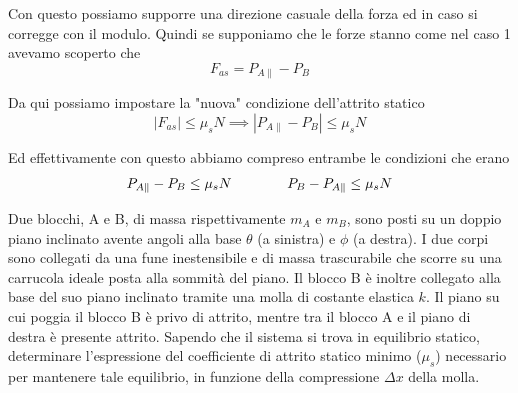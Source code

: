 \documentclass{rapport}
\begin{document}
Con questo possiamo supporre una direzione casuale della forza ed in caso si corregge con il modulo. Quindi se supponiamo che le forze stanno come nel caso 1 avevamo scoperto che 
\[
 F_{as} = P_{A\parallel} -P_{B}   
\]

Da qui possiamo impostare la "nuova" condizione dell'attrito statico 
\[
|F_{as}| \leq \mu_s N \implies |P_{A\parallel} -P_{B}  | \leq \mu_s N 
\]

Ed effettivamente con questo abbiamo compreso entrambe le condizioni che erano 
\[
\begin{array}{c@{\qquad}@{\qquad}c}
  P_{A\parallel} - P_{B}      \leq \mu_s N &   P_{B} -P_{A\parallel}      \leq \mu_s N
\end{array}
\]

\begin{esercizio}{}{}
  Due blocchi, A e B, di massa rispettivamente $m_A$ e $m_B$, sono posti su un doppio piano inclinato avente angoli alla base $\theta$ (a sinistra) e $\phi$ (a destra). I due corpi sono collegati da una fune inestensibile e di massa trascurabile che scorre su una carrucola ideale posta alla sommità del piano. Il blocco B è inoltre collegato alla base del suo piano inclinato tramite una molla di costante elastica $k$. Il piano su cui poggia il blocco B è privo di attrito, mentre tra il blocco A e il piano di destra è presente attrito.
Sapendo che il sistema si trova in equilibrio statico, determinare l'espressione del coefficiente di attrito statico minimo ($\mu_s$) necessario per mantenere tale equilibrio, in funzione della compressione $\Delta x$ della molla.
\end{esercizio}
\end{document}
